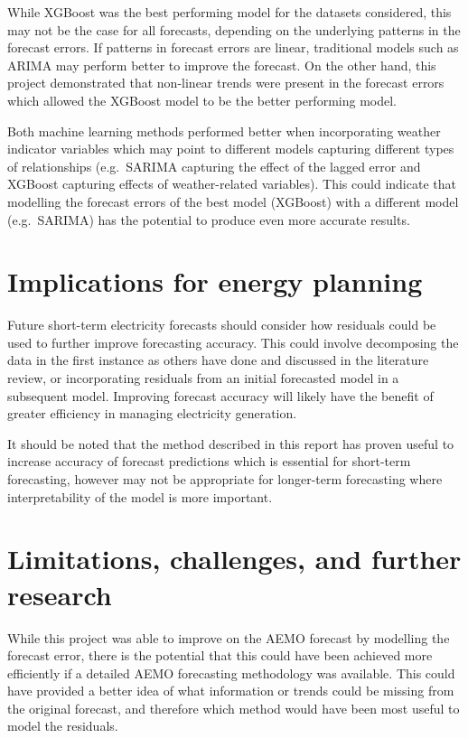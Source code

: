 \documentclass[mstat,12pt]{unswthesis}
\begin{document}
\bigskip

While XGBoost was the best performing model for the datasets considered, this may not be the case for all forecasts, depending on the underlying patterns in the forecast errors. If patterns in forecast errors are linear, traditional models such as ARIMA may perform better to improve the forecast. On the other hand, this project demonstrated that non-linear trends were present in the forecast errors which allowed the XGBoost model to be the better performing model.

\bigskip

Both machine learning methods performed better when incorporating weather indicator variables which may point to different models capturing different types of relationships (e.g.~SARIMA capturing the effect of the lagged error and XGBoost capturing effects of weather-related variables). This could indicate that modelling the forecast errors of the best model (XGBoost) with a different model (e.g.~SARIMA) has the potential to produce even more accurate results.

\section{Implications for energy planning}\label{implications-for-energy-planning}

Future short-term electricity forecasts should consider how residuals could be used to further improve forecasting accuracy. This could involve decomposing the data in the first instance as others have done and discussed in the literature review, or incorporating residuals from an initial forecasted model in a subsequent model. Improving forecast accuracy will likely have the benefit of greater efficiency in managing electricity generation.

\bigskip

It should be noted that the method described in this report has proven useful to increase accuracy of forecast predictions which is essential for short-term forecasting, however may not be appropriate for longer-term forecasting where interpretability of the model is more important.

\section{Limitations, challenges, and further research}\label{limitations-challenges-and-further-research}

While this project was able to improve on the AEMO forecast by modelling the forecast error, there is the potential that this could have been achieved more efficiently if a detailed AEMO forecasting methodology was available. This could have provided a better idea of what information or trends could be missing from the original forecast, and therefore which method would have been most useful to model the residuals.
\end{document}
